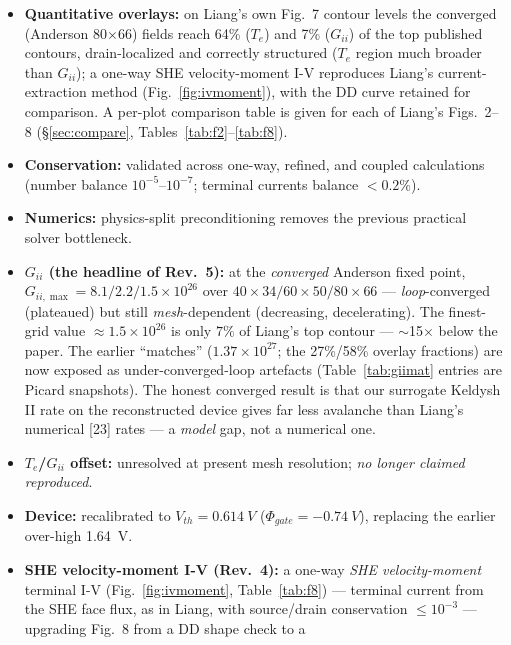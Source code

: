 \documentclass[11pt]{article}
\begin{document}
\begin{itemize}[leftmargin=1.4em,itemsep=2pt]
residual reaches a $\sim$3--4~mV inner-solve floor and $G_{ii}$ \emph{plateaus} (last-4 spread
1.6--11\%). $n$, $|v|$, $I_d$ are grid-stable; $T_e$ converges toward $\sim\!\SI{3200}{K}$.
\item \textbf{Quantitative overlays:} on Liang's own Fig.~7 contour levels the converged
(Anderson 80$\times$66) fields reach 64\% ($T_e$) and 7\% ($G_{ii}$) of the top
published contours, drain-localized and correctly structured ($T_e$ region much broader than
$G_{ii}$); a one-way SHE velocity-moment I-V reproduces Liang's current-extraction method
(Fig.~\ref{fig:ivmoment}), with the DD curve retained for comparison. A per-plot comparison table is
given for each of Liang's Figs.~2--8 (\S\ref{sec:compare}, Tables~\ref{tab:f2}--\ref{tab:f8}).
\item \textbf{Conservation:} validated across one-way, refined, and coupled calculations
(number balance $10^{-5}$--$10^{-7}$; terminal currents balance $<0.2\%$).
\item \textbf{Numerics:} physics-split preconditioning removes the previous practical solver
bottleneck.
\item \textbf{$G_{ii}$ (the headline of Rev.~5):} at the \emph{converged} Anderson fixed point,
$G_{ii,\max}=8.1/2.2/1.5\times10^{26}$ over $40{\times}34/60{\times}50/80{\times}66$ ---
\emph{loop}-converged (plateaued) but still \emph{mesh}-dependent (decreasing, decelerating). The
finest-grid value $\approx1.5\times10^{26}$ is only $7\%$ of Liang's top contour --- $\sim$15$\times$
below the paper. The earlier ``matches'' ($1.37\times10^{27}$; the 27\%/58\% overlay fractions) are
now exposed as under-converged-loop artefacts (Table~\ref{tab:giimat} entries are Picard snapshots).
The honest converged result is that our surrogate Keldysh II rate on the reconstructed device gives
far less avalanche than Liang's numerical [23] rates --- a \emph{model} gap, not a numerical one.
\item \textbf{$T_e$/$G_{ii}$ offset:} unresolved at present mesh resolution; \emph{no longer
claimed reproduced}.
\item \textbf{Device:} recalibrated to $V_{th}=\SI{0.614}{V}$ ($\Phi_{gate}=\SI{-0.74}{V}$),
replacing the earlier over-high \SI{1.64}{V}.
\item \textbf{SHE velocity-moment I-V (Rev.~4):} a one-way \emph{SHE velocity-moment} terminal I-V
(Fig.~\ref{fig:ivmoment}, Table~\ref{tab:f8}) --- terminal current from the SHE face flux, as in
Liang, with source/drain conservation $\le10^{-3}$ --- upgrading Fig.~8 from a DD shape check to a

\end{itemize}
\end{document}
